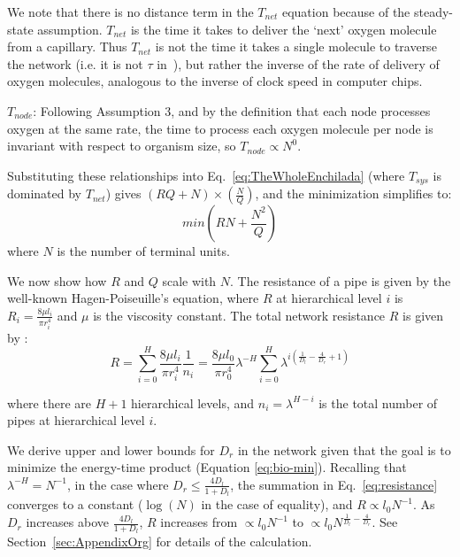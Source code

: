 \documentclass[12pt]{article}
\begin{document}
We note that there is no distance term in the $T_{net}$ equation because of the
steady-state assumption. $T_{net}$ is the time it takes to deliver the `next'
oxygen molecule from a capillary. Thus $T_{net}$ is not the time it takes a
single molecule to traverse the network (i.e. it is not $\tau$
in~\cite{banavar10}), but rather the inverse of the rate of delivery of
oxygen molecules, analogous to the inverse of clock speed in computer chips.

$T_{node}$: Following Assumption 3, and by the definition that each node processes oxygen at the same rate, the time to process each oxygen molecule per node is invariant with respect to organism size, so $T_{node} \propto N^0$.


Substituting these relationships into Eq.~\ref{eq:TheWholeEnchilada} (where $T_{sys}$ is dominated by $T_{net}$) gives
$(RQ + N) \times (\frac{N}{Q})$, and the minimization simplifies to:
\begin{equation}
 min (RN + \frac{N^2}{Q})
\label{eq:bio-min}
\end{equation}
\noindent where $N$ is the number of terminal units.  

We now show how $R$ and $Q$ scale with $N$. The resistance of a pipe is given by the well-known Hagen-Poiseuille's
equation, where $R$ at hierarchical level $i$ is $R_i = \frac{8\mu l_i}{\pi
r_i^4}$ and $\mu$ is the viscosity constant.  The total network resistance
$R$ is given by \cite{west97}:
\begin{equation}
\label{eq:resistance}
R = \sum_{i=0}^H \frac{8\mu l_i}{\pi r_i^4}\frac{1}{n_i}
= \frac{8\mu l_0}{\pi r_0^4} \lambda^{-H}\sum_{i=0}^H \lambda^{i 
\left(\frac{1}{D_l} - \frac{4}{D_r} + 1 \right)}
\end{equation}

\noindent where there are $H+1$ hierarchical levels, and $n_i = \lambda^{H-i}$
is the total number of pipes at hierarchical level $i$.  

We derive upper and lower bounds for $D_r$ in the network given that the goal
is to minimize the energy-time product (Equation \ref{eq:bio-min}).  Recalling
that $\lambda^{-H} = N^{-1}$, in the case
where $D_r \leq \frac{4D_l}{1+D_l}$, the summation in Eq.~\ref{eq:resistance} converges to a
constant ($\log(N)$ in the case of equality), and $R \propto l_0 N^{-1}$. As
$D_r$ increases above $\frac{4D_l}{1+D_l}$, $R$ increases from $\propto l_0 N^{-1}$ to $\propto
l_0 N^{\frac{1}{D_l} - \frac{4}{D_r}}$. 
See Section~\ref{sec:AppendixOrg} for details of the calculation.
\end{document}
